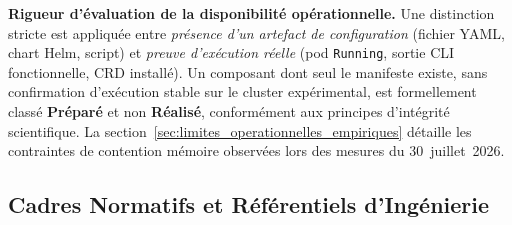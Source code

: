 \textbf{Rigueur d'évaluation de la disponibilité opérationnelle.} Une distinction stricte est appliquée entre \textit{présence d'un artefact de configuration} (fichier YAML, chart Helm, script) et \textit{preuve d'exécution réelle} (pod \texttt{Running}, sortie CLI fonctionnelle, CRD installé). Un composant dont seul le manifeste existe, sans confirmation d'exécution stable sur le cluster expérimental, est formellement classé \textbf{Préparé} et non \textbf{Réalisé}, conformément aux principes d'intégrité scientifique. La section~\ref{sec:limites_operationnelles_empiriques} détaille les contraintes de contention mémoire observées lors des mesures du 30~juillet~2026.

\subsection{Cadres Normatifs et Référentiels d'Ingénierie}

